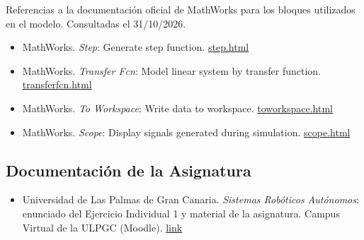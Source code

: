 \documentclass[12pt,a4paper]{article}
\begin{document}
Referencias a la documentación oficial de MathWorks para los bloques utilizados en el modelo. Consultadas el 31/10/2026.

\begin{itemize}[label=$\bullet$]
  \item MathWorks. \textit{Step}: Generate step function. \href{https://www.mathworks.com/help/simulink/slref/step.html}{step.html}
  \item MathWorks. \textit{Transfer Fcn}: Model linear system by transfer function. \href{https://www.mathworks.com/help/simulink/slref/transferfcn.html}{transferfcn.html}
  \item MathWorks. \textit{To Workspace}: Write data to workspace. \href{https://www.mathworks.com/help/simulink/slref/toworkspace.html}{toworkspace.html}
  \item MathWorks. \textit{Scope}: Display signals generated during simulation. \href{https://www.mathworks.com/help/simulink/slref/scope.html}{scope.html}
\end{itemize}

\subsection{Documentación de la Asignatura}

\begin{itemize}[label=$\bullet$]
  \item Universidad de Las Palmas de Gran Canaria. \textit{Sistemas Robóticos Autónomos}: enunciado del Ejercicio Individual 1 y material de la asignatura. Campus Virtual de la ULPGC (Moodle). \href{https://aep27.ulpgc.es/course/view.php?id=2176}{link}
\end{itemize}
\end{document}
